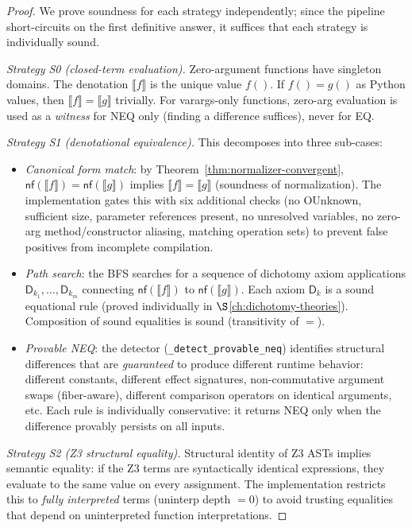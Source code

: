 \documentclass[11pt,a4paper]{report}
\theoremstyle{definition}
\theoremstyle{plain}
\newcommand{\den}[1]{\llbracket #1 \rrbracket}
\begin{document}
\begin{proof}
We prove soundness for each strategy independently; since the
pipeline short-circuits on the first definitive answer, it suffices
that each strategy is individually sound.

\emph{Strategy S0 (closed-term evaluation).}
Zero-argument functions have singleton domains.  The denotation
$\den{f}$ is the unique value $f()$.  If $f() = g()$ as Python
values, then $\den{f} = \den{g}$ trivially.  For varargs-only
functions, zero-arg evaluation is used as a \emph{witness} for NEQ
only (finding a difference suffices), never for EQ.

\emph{Strategy S1 (denotational equivalence).}
This decomposes into three sub-cases:
\begin{itemize}
  \item \emph{Canonical form match}: by
    Theorem~\ref{thm:normalizer-convergent}, $\mathsf{nf}(\den{f})
    = \mathsf{nf}(\den{g})$ implies $\den{f} = \den{g}$ (soundness
    of normalization).  The implementation gates this with six
    additional checks (no OUnknown, sufficient size, parameter
    references present, no unresolved variables, no zero-arg
    method/constructor aliasing, matching operation sets) to prevent
    false positives from incomplete compilation.

  \item \emph{Path search}: the BFS searches for a sequence of
    dichotomy axiom applications $\mathsf{D}_{k_1}, \ldots,
    \mathsf{D}_{k_m}$ connecting $\mathsf{nf}(\den{f})$ to
    $\mathsf{nf}(\den{g})$.  Each axiom $\mathsf{D}_k$ is a
    sound equational rule (proved individually in
    $\S$\ref{ch:dichotomy-theories}).  Composition of sound
    equalities is sound (transitivity of $=$).

  \item \emph{Provable NEQ}: the detector
    (\texttt{\_detect\_provable\_neq}) identifies structural
    differences that are \emph{guaranteed} to produce different
    runtime behavior: different constants, different effect
    signatures, non-commutative argument swaps (fiber-aware),
    different comparison operators on identical arguments, etc.
    Each rule is individually conservative: it returns NEQ only
    when the difference provably persists on all inputs.
\end{itemize}

\emph{Strategy S2 (Z3 structural equality).}
Structural identity of Z3 ASTs implies semantic equality: if the
Z3 terms are syntactically identical expressions, they evaluate to
the same value on every assignment.  The implementation restricts
this to \emph{fully interpreted} terms (uninterp depth $= 0$) to
avoid trusting equalities that depend on uninterpreted function
interpretations.


\end{proof}
\end{document}
